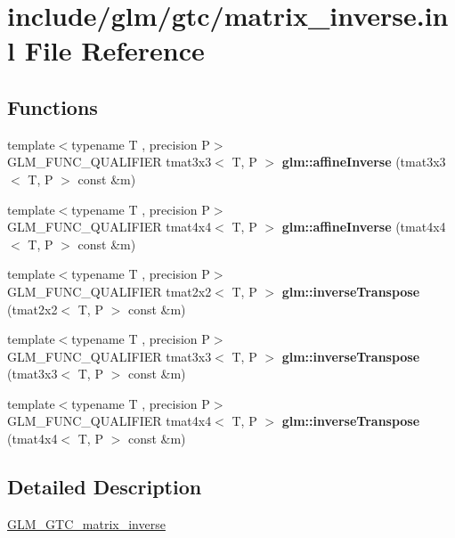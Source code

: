 \hypertarget{matrix__inverse_8inl}{}\section{include/glm/gtc/matrix\+\_\+inverse.inl File Reference}
\label{matrix__inverse_8inl}
\subsection*{Functions}
\begin{DoxyCompactItemize}
\item 
\mbox{\label{matrix__inverse_8inl_ae7dd7d782251f5939d55b8f8d8097d3f}} 
{\footnotesize template$<$typename T , precision P$>$ }\\G\+L\+M\+\_\+\+F\+U\+N\+C\+\_\+\+Q\+U\+A\+L\+I\+F\+I\+ER tmat3x3$<$ T, P $>$ {\bfseries glm\+::affine\+Inverse} (tmat3x3$<$ T, P $>$ const \&m)
\item 
\mbox{\label{matrix__inverse_8inl_aae96d3c56681fe2da653a612320b5c51}} 
{\footnotesize template$<$typename T , precision P$>$ }\\G\+L\+M\+\_\+\+F\+U\+N\+C\+\_\+\+Q\+U\+A\+L\+I\+F\+I\+ER tmat4x4$<$ T, P $>$ {\bfseries glm\+::affine\+Inverse} (tmat4x4$<$ T, P $>$ const \&m)
\item 
\mbox{\label{matrix__inverse_8inl_a926e019cbcdde3db9739b175f86b074c}} 
{\footnotesize template$<$typename T , precision P$>$ }\\G\+L\+M\+\_\+\+F\+U\+N\+C\+\_\+\+Q\+U\+A\+L\+I\+F\+I\+ER tmat2x2$<$ T, P $>$ {\bfseries glm\+::inverse\+Transpose} (tmat2x2$<$ T, P $>$ const \&m)
\item 
\mbox{\label{matrix__inverse_8inl_a3b95ed2233ca365d49d19aea958c7f28}} 
{\footnotesize template$<$typename T , precision P$>$ }\\G\+L\+M\+\_\+\+F\+U\+N\+C\+\_\+\+Q\+U\+A\+L\+I\+F\+I\+ER tmat3x3$<$ T, P $>$ {\bfseries glm\+::inverse\+Transpose} (tmat3x3$<$ T, P $>$ const \&m)
\item 
\mbox{\label{matrix__inverse_8inl_a38637490a036240e2fdcc490e7870a26}} 
{\footnotesize template$<$typename T , precision P$>$ }\\G\+L\+M\+\_\+\+F\+U\+N\+C\+\_\+\+Q\+U\+A\+L\+I\+F\+I\+ER tmat4x4$<$ T, P $>$ {\bfseries glm\+::inverse\+Transpose} (tmat4x4$<$ T, P $>$ const \&m)
\end{DoxyCompactItemize}


\subsection{Detailed Description}
\hyperlink{group__gtc__matrix__inverse}{G\+L\+M\+\_\+\+G\+T\+C\+\_\+matrix\+\_\+inverse} 